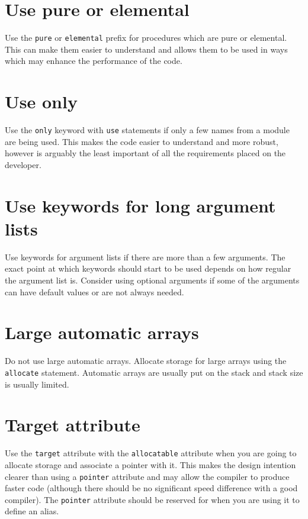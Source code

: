 \documentclass[11pt,twoside,a4paper]{report}
\begin{document}
\section{Use pure or elemental}
Use the \verb|pure| or \verb|elemental| prefix for procedures which
are pure or elemental. This can make them easier to understand 
and allows them to be used in ways which may enhance the performance of
the code.

\section{Use only}

Use the \verb|only| keyword with \verb|use| statements if only a few
names from a module are being used. This makes the code easier to
understand and more robust, however is arguably the least important of
all the requirements placed on the developer.

\section{Use keywords for long argument lists}

Use keywords for argument lists if there are more than a few
arguments. The exact point at which keywords should start to be used
depends on how regular the argument list is. Consider using
optional arguments if some of the arguments can have default values
or are not always needed.

\section{Large automatic arrays}

Do not use large automatic arrays. Allocate storage
for large arrays using the \verb|allocate| statement.
Automatic arrays are usually put on the stack and stack size is
usually limited.

\section{Target attribute}

Use the \verb|target| attribute with the \verb|allocatable| attribute
when you are going to allocate storage and associate a pointer with
it. This makes the design intention clearer than using a \verb|pointer|
attribute and may allow the compiler to produce faster code (although
there should be no significant speed difference with a good compiler).
The \verb|pointer| attribute should be reserved for when you are using
it to define an alias.
\end{document}
